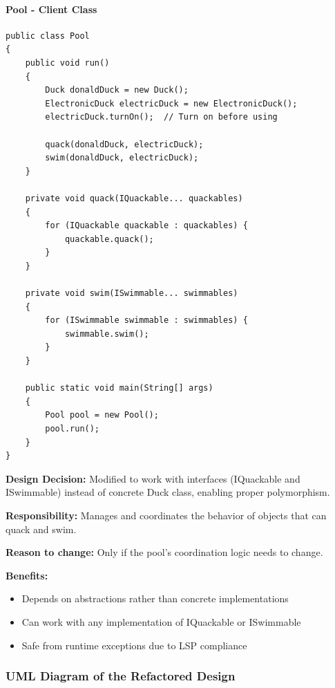 \paragraph{Pool - Client Class}

\begin{verbatim}
public class Pool
{
    public void run()
    {
        Duck donaldDuck = new Duck();
        ElectronicDuck electricDuck = new ElectronicDuck();
        electricDuck.turnOn();  // Turn on before using
        
        quack(donaldDuck, electricDuck);
        swim(donaldDuck, electricDuck);
    }

    private void quack(IQuackable... quackables)
    {
        for (IQuackable quackable : quackables) {
            quackable.quack();
        }
    }

    private void swim(ISwimmable... swimmables)
    {
        for (ISwimmable swimmable : swimmables) {
            swimmable.swim();
        }
    }

    public static void main(String[] args)
    {
        Pool pool = new Pool();
        pool.run();
    }
}
\end{verbatim}

\textbf{Design Decision:} Modified to work with interfaces (IQuackable and ISwimmable) instead of concrete Duck class, enabling proper polymorphism.

\textbf{Responsibility:} Manages and coordinates the behavior of objects that can quack and swim.

\textbf{Reason to change:} Only if the pool's coordination logic needs to change.

\textbf{Benefits:}
\begin{itemize}
    \item Depends on abstractions rather than concrete implementations
    \item Can work with any implementation of IQuackable or ISwimmable
    \item Safe from runtime exceptions due to LSP compliance
\end{itemize}

\subsubsection{UML Diagram of the Refactored Design}

